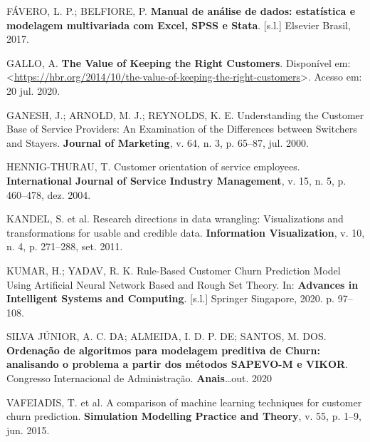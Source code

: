\documentclass[twocolumn]{rbef}
\newcommand{\1}{\mathbbm{1}}
\begin{document}
\leavevmode\hypertarget{ref-Favero2017}{}%
FÁVERO, L. P.; BELFIORE, P. \textbf{Manual de análise de dados: estatística e modelagem multivariada com Excel, SPSS e Stata}. {[}s.l.{]} Elsevier Brasil, 2017.

\leavevmode\hypertarget{ref-Gallo2014}{}%
GALLO, A. \textbf{The Value of Keeping the Right Customers}. Disponível em: \textless{}\url{https://hbr.org/2014/10/the-value-of-keeping-the-right-customers}\textgreater. Acesso em: 20 jul. 2020.

\leavevmode\hypertarget{ref-Ganesh2000}{}%
GANESH, J.; ARNOLD, M. J.; REYNOLDS, K. E. Understanding the Customer Base of Service Providers: An Examination of the Differences between Switchers and Stayers. \textbf{Journal of Marketing}, v. 64, n. 3, p. 65--87, jul. 2000.

\leavevmode\hypertarget{ref-HennigThurau2004}{}%
HENNIG-THURAU, T. Customer orientation of service employees. \textbf{International Journal of Service Industry Management}, v. 15, n. 5, p. 460--478, dez. 2004.

\leavevmode\hypertarget{ref-Kandel2011}{}%
KANDEL, S. et al. Research directions in data wrangling: Visualizations and transformations for usable and credible data. \textbf{Information Visualization}, v. 10, n. 4, p. 271--288, set. 2011.

\leavevmode\hypertarget{ref-Kumar2020}{}%
KUMAR, H.; YADAV, R. K. Rule-Based Customer Churn Prediction Model Using Artificial Neural Network Based and Rough Set Theory. In: \textbf{Advances in Intelligent Systems and Computing}. {[}s.l.{]} Springer Singapore, 2020. p. 97--108.

\leavevmode\hypertarget{ref-Junior2020}{}%
SILVA JÚNIOR, A. C. DA; ALMEIDA, I. D. P. DE; SANTOS, M. DOS. \textbf{Ordenação de algoritmos para modelagem preditiva de Churn: analisando o problema a partir dos métodos SAPEVO-M e VIKOR}. Congresso Internacional de Administração. \textbf{Anais}\ldots out. 2020

\leavevmode\hypertarget{ref-Vafeiadis2015}{}%
VAFEIADIS, T. et al. A comparison of machine learning techniques for customer churn prediction. \textbf{Simulation Modelling Practice and Theory}, v. 55, p. 1--9, jun. 2015.
\end{document}
